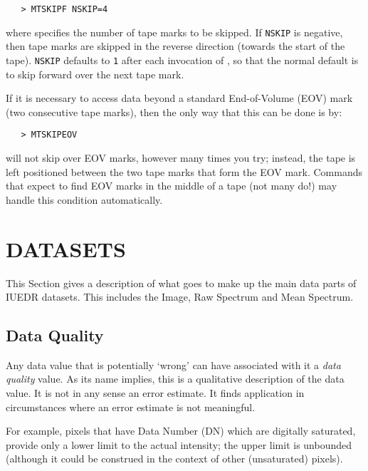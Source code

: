 \begin{verbatim}
   > MTSKIPF NSKIP=4
\end{verbatim}

where 
 specifies the number of tape marks to be skipped.  If
\verb+NSKIP+
is negative, then tape marks are skipped in the reverse direction
(towards the start of the tape)\@.  \verb+NSKIP+ defaults to \verb+1+ after each
invocation of , so that the normal 
default is to skip forward over the next tape mark.

If it is necessary to access data beyond a standard End-of-Volume (EOV) mark
(two consecutive tape marks), then the only way that this can be done is by:

\begin{verbatim}
   > MTSKIPEOV
\end{verbatim}

 will not skip over EOV marks, however many times you try; instead,
the tape is left positioned between the two tape marks that form the EOV mark.
Commands that expect to find EOV marks in the middle of a tape (not
many do!) may handle this condition automatically.


\section{\label{se:datasets}DATASETS}

This Section gives a description of what goes to make up the main data parts
of IUEDR datasets.  This includes the Image, Raw Spectrum and Mean Spectrum.


\subsection{Data Quality}

Any data value that is potentially `wrong' can have associated with it a {\em
data quality} value.  As its name implies, this is a qualitative description of
the data value.  It is not in any sense an error estimate.  It finds
application in circumstances where an error estimate is not meaningful.

For example, pixels that have Data Number (DN) which are digitally
saturated, provide only a lower limit to the actual intensity; the
upper limit is unbounded (although it could be construed in the context
of other (unsaturated) pixels)\@.

